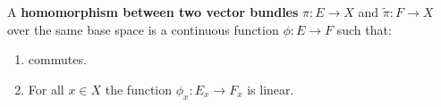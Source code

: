 \begin{definition}\label{def:vb-homomorphismOfVectorBundles}
	A \textbf{homomorphism between two vector bundles} $\pi: E\to X$ and $\tilde{\pi}: F\to X$ over the same base space is a continuous function $\phi: E \to F$ such that: 
	\begin{enumerate}
		\item {} commutes.
		\item For all $x\in X$ the function $\phi_x: E_x\to F_x$ is linear. 
	\end{enumerate} 
\end{definition}


